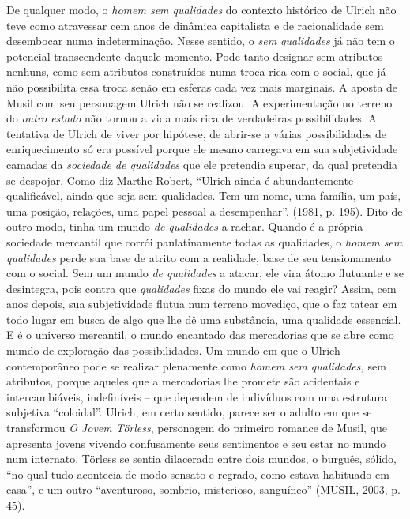De qualquer modo, o \emph{homem sem qualidades} do contexto histórico de
Ulrich não teve como atravessar cem anos de dinâmica capitalista e de
racionalidade sem desembocar numa indeterminação. Nesse sentido, o
\emph{sem qualidades} já não tem o potencial transcendente daquele
momento. Pode tanto designar sem atributos nenhuns, como sem atributos
construídos numa troca rica com o social, que já não possibilita essa
troca senão em esferas cada vez mais marginais. A aposta de Musil com
seu personagem Ulrich não se realizou. A experimentação no terreno do
\emph{outro estado} não tornou a vida mais rica de verdadeiras
possibilidades. A tentativa de Ulrich de viver por hipótese, de abrir-se
a várias possibilidades de enriquecimento só era possível porque ele
mesmo carregava em sua subjetividade camadas da \emph{sociedade de
qualidades} que ele pretendia superar, da qual pretendia se despojar.
Como diz Marthe Robert, ``Ulrich ainda é abundantemente qualificável,
ainda que seja sem qualidades. Tem um nome, uma família, um país, uma
posição, relações, uma papel pessoal a desempenhar''. (1981, p. 195).
Dito de outro modo, tinha um mundo \emph{de qualidades} a rachar. Quando
é a própria sociedade mercantil que corrói paulatinamente todas as
qualidades, o \emph{homem sem qualidades} perde sua base de atrito com a
realidade, base de seu tensionamento com o social. Sem um mundo \emph{de
qualidades} a atacar, ele vira átomo flutuante e se desintegra, pois
contra que \emph{qualidades} fixas do mundo ele vai reagir? Assim, cem
anos depois, sua subjetividade flutua num terreno movediço, que o faz
tatear em todo lugar em busca de algo que lhe dê uma substância, uma
qualidade essencial. E é o universo mercantil, o mundo encantado das
mercadorias que se abre como mundo de exploração das possibilidades. Um
mundo em que o Ulrich contemporâneo pode se realizar plenamente como
\emph{homem sem qualidades,} sem atributos, porque aqueles que a
mercadorias lhe promete são acidentais e intercambiáveis, indefiníveis
-- que dependem de indivíduos com uma estrutura subjetiva ``coloidal''.
Ulrich, em certo sentido, parece ser o adulto em que se transformou
\emph{O Jovem} \emph{Törless}, personagem do primeiro romance de Musil,
que apresenta jovens vivendo confusamente seus sentimentos e seu estar
no mundo num internato. Törless se sentia dilacerado entre dois mundos,
o burguês, sólido, ``no qual tudo acontecia de modo sensato e regrado,
como estava habituado em casa'', e um outro ``aventuroso, sombrio,
misterioso, sanguíneo'' (MUSIL, 2003, p. 45).

